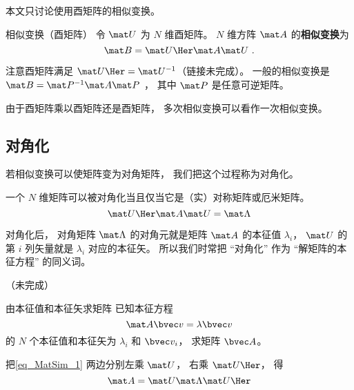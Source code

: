
本文只讨论使用酉矩阵的相似变换。

\begin{definition}{相似变换（酉矩阵）}\label{def_MatSim_1}
令 $\mat U$ 为 $N$ 维酉矩阵。 $N$ 维方阵 $\mat A$ 的\textbf{相似变换}为
\begin{equation}
\mat B = \mat U\Her \mat A \mat U~.
\end{equation}
\end{definition}

注意酉矩阵满足 $\mat U\Her = \mat U^{-1}$（链接未完成）。 一般的相似变换是 $\mat B = \mat P^{-1} \mat A \mat P$ ， 其中 $\mat P$ 是任意可逆矩阵。

由于酉矩阵乘以酉矩阵还是酉矩阵， 多次相似变换可以看作一次相似变换。

\subsection{对角化}
若相似变换可以使矩阵变为对角矩阵， 我们把这个过程称为对角化。

一个 $N$ 维矩阵可以被对角化当且仅当它是（实）对称矩阵或厄米矩阵。
\begin{equation}\label{eq_MatSim_1}
\mat U\Her \mat A \mat U = \mat \Lambda
\end{equation}

对角化后， 对角矩阵 $\mat \Lambda$ 的对角元就是矩阵 $\mat A$ 的本征值 $\lambda_i$， $\mat U$ 的第 $i$ 列矢量就是 $\lambda_i$ 对应的本征矢。 所以我们时常把 “对角化” 作为 “解矩阵的本征方程” 的同义词。

（未完成）

\begin{example}{由本征值和本征矢求矩阵}
已知本征方程
\begin{equation}
\mat A \bvec v = \lambda \bvec v
\end{equation}
的 $N$ 个本征值和本征矢为 $\lambda_i$ 和 $\bvec v_i$， 求矩阵 $\bvec A$。

把\autoref{eq_MatSim_1} 两边分别左乘 $\mat U$， 右乘 $\mat U\Her$， 得
\begin{equation}
\mat A = \mat U \mat \Lambda \mat U\Her
\end{equation}
\end{example}
